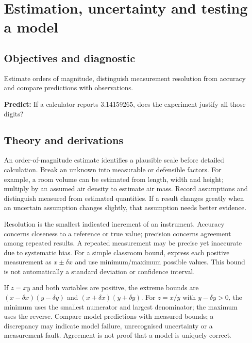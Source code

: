 \documentclass[11pt,a4paper,openany]{book}
\begin{document}
\chapter{Estimation, uncertainty and testing a model}
\section{Objectives and diagnostic}
Estimate orders of magnitude, distinguish measurement resolution from accuracy and compare predictions with observations.

\textbf{Predict:} If a calculator reports 3.14159265, does the experiment justify all those digits?
\section{Theory and derivations}
An order-of-magnitude estimate identifies a plausible scale before detailed calculation. Break an unknown into measurable or defensible factors. For example, a room volume can be estimated from length, width and height; multiply by an assumed air density to estimate air mass. Record assumptions and distinguish measured from estimated quantities. If a result changes greatly when an uncertain assumption changes slightly, that assumption needs better evidence.

Resolution is the smallest indicated increment of an instrument. Accuracy concerns closeness to a reference or true value; precision concerns agreement among repeated results. A repeated measurement may be precise yet inaccurate due to systematic bias. For a simple classroom bound, express each positive measurement as $x\pm\delta x$ and use minimum/maximum possible values. This bound is not automatically a standard deviation or confidence interval.

If $z=xy$ and both variables are positive, the extreme bounds are $(x-\delta x)(y-\delta y)$ and $(x+\delta x)(y+\delta y)$. For $z=x/y$ with $y-\delta y>0$, the minimum uses the smallest numerator and largest denominator; the maximum uses the reverse. Compare model predictions with measured bounds; a discrepancy may indicate model failure, unrecognised uncertainty or a measurement fault. Agreement is not proof that a model is uniquely correct.
\begin{center}
\end{center}
\end{document}
